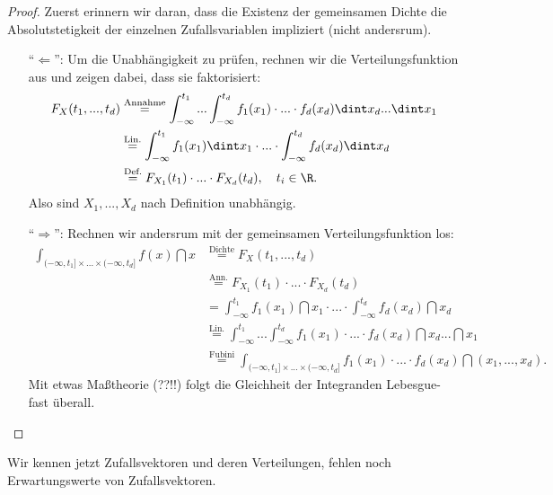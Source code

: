 \begin{proof}
	Zuerst erinnern wir daran, dass die Existenz der gemeinsamen Dichte die Absolutstetigkeit der einzelnen Zufallsvariablen impliziert (nicht andersrum). 
	\begin{itemize}
	\item[\enquote{$\Leftarrow$}:] Um die Unabh\"angigkeit zu pr\"ufen, rechnen wir die Verteilungsfunktion aus und zeigen dabei, dass sie faktorisiert:
	\begin{align*}
	F_X(t_1,...,t_d) &\overset{\text{Annahme}}{=} \int_{-\infty}^{t_1} ... \int_{-\infty}^{t_d} f_1(x_1) \cdot ... \cdot f_d(x_d) \dint x_d ... \dint x_1\\
	& \overset{\text{Lin.}}{=} \int_{-\infty}^{t_1} f_1(x_1) \dint x_1 \cdot ... \cdot \int_{-\infty}^{t_d} f_d(x_d) \dint x_d\\
	&\overset{\text{Def.}}{=} F_{X_1}(t_1) \cdot ... \cdot F_{X_d}(t_d),\quad t_i\in\R.
	\end{align*}
	Also sind $X_1,...,X_d$ nach Definition unabhängig.
	\item[\enquote{$\Rightarrow$}:] Rechnen wir andersrum mit der gemeinsamen Verteilungsfunktion los:	
	\begin{align*}
		\int_{(-\infty,t_1] \times ... \times (-\infty,t_d]} f(x) \dint x &\overset{\text{Dichte}}{=} F_X(t_1,...,t_d)\\
		& \overset{\text{Ann.}}{=} F_{X_1}(t_1) \cdot ... \cdot F_{X_d}(t_d)\\
		& = \int_{-\infty}^{t_1} f_1(x_1) \dint x_1 \cdot ... \cdot \int_{-\infty}^{t_d} f_d(x_d)\dint x_d\\
		&\overset{\text{Lin.}}{=}\int_{-\infty}^{t_1} ... \int_{-\infty}^{t_d} f_1(x_1) \cdot ... \cdot f_d(x_d) \dint x_d ... \dint x_1\\
		& \overset{\text{Fubini}}{=} \int_{(-\infty,t_1] \times ... \times (-\infty,t_d]} f_1(x_1) \cdot ... \cdot f_d(x_d) \dint (x_1,...,x_d).
	\end{align*}
	Mit etwas Ma\ss theorie (??!!) folgt die Gleichheit der Integranden Lebesgue-fast \"uberall.
	\end{itemize}
\end{proof}
Wir kennen jetzt Zufallsvektoren und deren Verteilungen, fehlen noch Erwartungswerte von Zufallsvektoren.

